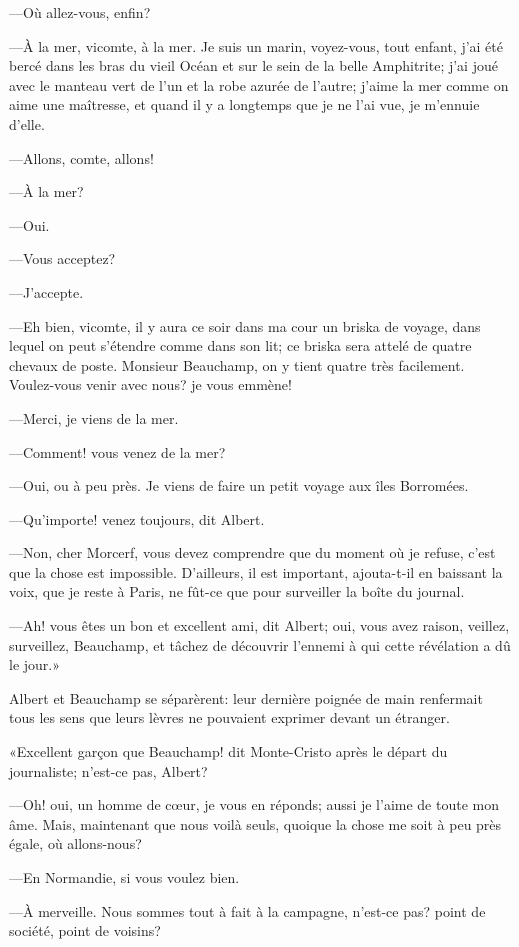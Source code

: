 —Où allez-vous, enfin? 

—À la mer, vicomte, à la mer. Je suis un marin, voyez-vous, tout enfant, j'ai été bercé dans les bras du vieil Océan et sur le sein de la belle Amphitrite; j'ai joué avec le manteau vert de l'un et la robe azurée de l'autre; j'aime la mer comme on aime une maîtresse, et quand il y a longtemps que je ne l'ai vue, je m'ennuie d'elle. 

—Allons, comte, allons! 

—À la mer? 

—Oui. 

—Vous acceptez? 

—J'accepte. 

—Eh bien, vicomte, il y aura ce soir dans ma cour un briska de voyage, dans lequel on peut s'étendre comme dans son lit; ce briska sera attelé de quatre chevaux de poste. Monsieur Beauchamp, on y tient quatre très facilement. Voulez-vous venir avec nous? je vous emmène! 

—Merci, je viens de la mer. 

—Comment! vous venez de la mer? 

—Oui, ou à peu près. Je viens de faire un petit voyage aux îles Borromées. 

—Qu'importe! venez toujours, dit Albert. 

—Non, cher Morcerf, vous devez comprendre que du moment où je refuse, c'est que la chose est impossible. D'ailleurs, il est important, ajouta-t-il en baissant la voix, que je reste à Paris, ne fût-ce que pour surveiller la boîte du journal. 

—Ah! vous êtes un bon et excellent ami, dit Albert; oui, vous avez raison, veillez, surveillez, Beauchamp, et tâchez de découvrir l'ennemi à qui cette révélation a dû le jour.» 

Albert et Beauchamp se séparèrent: leur dernière poignée de main renfermait tous les sens que leurs lèvres ne pouvaient exprimer devant un étranger. 

«Excellent garçon que Beauchamp! dit Monte-Cristo après le départ du journaliste; n'est-ce pas, Albert? 

—Oh! oui, un homme de cœur, je vous en réponds; aussi je l'aime de toute mon âme. Mais, maintenant que nous voilà seuls, quoique la chose me soit à peu près égale, où allons-nous? 

—En Normandie, si vous voulez bien. 

—À merveille. Nous sommes tout à fait à la campagne, n'est-ce pas? point de société, point de voisins? 

